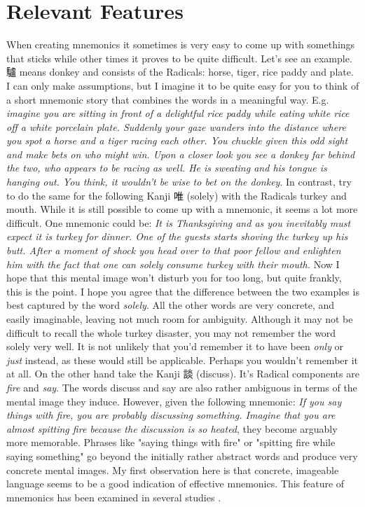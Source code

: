 \section{Relevant Features} \label{sec:body_relevant_features}

When creating mnemonics it sometimes is very easy to come up with somethings that sticks while other times it proves to be quite difficult. Let's see an example. 驢 means donkey and consists of the Radicals: horse, tiger, rice paddy and plate. I can only make assumptions, but I imagine it to be quite easy for you to think of a short mnemonic story that combines the words in a meaningful way. E.g. \emph{imagine you are sitting in front of a delightful rice paddy while eating white rice off a white porcelain plate. Suddenly your gaze wanders into the distance where you spot a horse and a tiger racing each other. You chuckle given this odd sight and make bets on who might win. Upon a closer look you see a donkey far behind the two, who appears to be racing as well. He is sweating and his tongue is hanging out. You think, it wouldn't be wise to bet on the donkey}. In contrast, try to do the same for the following Kanji 唯 (solely) with the Radicals turkey and mouth. While it is still possible to come up with a mnemonic, it seems a lot more difficult. One mnemonic could be: \emph{It is Thanksgiving and as you inevitably must expect it is turkey for dinner. One of the guests starts shoving the turkey up his butt.  After a moment of shock you head over to that poor fellow and  enlighten him with the fact that one can solely consume turkey with their mouth.} Now I hope that this mental image won't disturb you for too long, but quite frankly, this is the point. I hope you agree that the difference between the two examples is best captured by the word \emph{solely}. All the other words are very concrete, and easily imaginable, leaving not much room for ambiguity. Although it may not be difficult to recall the whole turkey disaster, you may not remember the word solely very well. It is not unlikely that you'd remember it to have been \emph{only} or \emph{just} instead, as these would still be applicable. Perhaps you wouldn't remember it at all. On the other hand take the Kanji 談 (discuss). It's Radical components are \emph{fire} and \emph{say}. The words discuss and say are also rather ambiguous in terms of the mental image they induce. However, given the following mnemonic: \emph{If you say things with fire, you are probably discussing something. Imagine that you are almost spitting fire because the discussion is so heated}, they become arguably more memorable. Phrases like "saying things with fire" or "spitting fire while saying something" go beyond the initially rather abstract words and produce very concrete mental images. My first observation here is that concrete, imageable language seems to be a good indication of effective mnemonics. This feature of mnemonics has been examined in  several studies \cite{campos_2004} \cite{campos_2011} \cite{kordjazi2014effect}.

